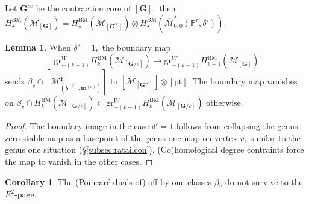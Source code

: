 \documentclass[12pt,reqno]{amsart}
\theoremstyle{definition}
\theoremstyle{definition}
\theoremstyle{definition}
\theoremstyle{definition}
\newtheorem{corollary}[theorem]{Corollary}
\newtheorem{lemma}[theorem]{Lemma}
\newcommand{\ol}[1]{\overline{#1}}
\newcommand{\PP}{\mathbb{P}}
\newcommand{\Mcal}{\mathcal{M}}
\newcommand{\Mbar}{\ol{\Mcal}}
\newcommand{\Mtil}{\widetilde{\mathcal{M}}}
\newcommand{\gr}{\mathrm{gr}}
\begin{document}
Let $\mathbf{G}^{{cc}}$ be the contraction core of $[\mathbf{G}],$ then $H_{\star}^{\mathrm{BM}}(\Mtil_{[\mathbf{G}]}) = H_{\star}^{\mathrm{BM}}(\Mtil_{[\mathbf{G}^{{cc}}]})\otimes H_{\star}^{\mathrm{BM}}(\Mbar_{0,0}^*(\PP^r,\delta')).$

\begin{lemma}\label{lem:g0baspt}
  When $\delta' = 1,$ the boundary map $$\gr^W_{-(k-1)}H_{k}^{\mathrm{BM}}(\Mtil_{[\mathbf{G}/e]})\to \gr^W_{-(k-1)}H_{k-1}^{\mathrm{BM}}(\Mtil_{[\mathbf{G}]})$$ sends $\beta_v\cap [\mathcal{M}^{\mathbf{F}}_{(\boldsymbol{\delta}^{(r)}, \boldsymbol{m}^{(r)})}]$ to $[\Mtil_{[\mathbf{G}^{cc}]}]\otimes [\mathrm{pt}].$ The boundary map vanishes on $\beta_v\cap H_{k}^{\mathrm{BM}}(\Mtil_{[\mathbf{G}/e]})\subset \gr^W_{-(k-1)}H_{k}^{\mathrm{BM}}(\Mtil_{[\mathbf{G}/e]})$ otherwise.
\end{lemma}
\begin{proof}
  The boundary image in the case $\delta'=1$ follows from collapsing the genus zero stable map as a basepoint of the genus one map on vertex $v,$ similar to the genus one situation (§\ref{subsec:ratailcon}). (Co)homological degree contraints force the map to vanish in the other cases. 
\end{proof}

\begin{corollary}\label{cor:g0basptE2}
  The (Poincaré duals of) off-by-one classes $\beta_v$ do not survive to the $E^2$-page.
\end{corollary}
\end{document}
